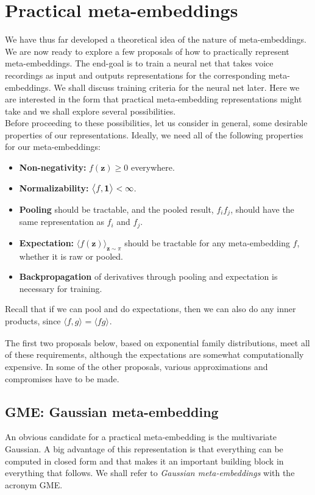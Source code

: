 \documentclass[a4paper,oneside,12pt,english]{report}
\def\zvec{\mathbf{z}}
\def\expv#1#2{\bigl\langle#1\bigr\rangle_{#2}}
\def\dot#1#2{\expv{#1,#2}{}}
\begin{document}
\chapter{Practical meta-embeddings}
We have thus far developed a theoretical idea of the nature of meta-embeddings. We are now ready to explore a few proposals of how to practically represent meta-embeddings. The end-goal is to train a neural net that takes voice recordings as input and outputs  representations for the corresponding meta-embeddings. We shall discuss training criteria for the neural net later. Here we are interested in the form that practical meta-embedding representations might take and we shall explore several possibilities. \\

\noindent Before proceeding to these possibilities, let us consider in general, some desirable properties of our representations. Ideally, we need all of the following properties for our meta-embeddings:
\begin{itemize}
	\item[] \textbf{Non-negativity:} $f(\zvec)\ge0$ everywhere.
	\item[] \textbf{Normalizability:} $\dot{f}{\onevec}<\infty$.
	\item[] \textbf{Pooling} should be tractable, and the pooled result, $f_if_j$, should have the same representation as $f_i$ and $f_j$.
	\item[] \textbf{Expectation:}  $\expv{f(\zvec)}{\zvec\sim\pi}$ should be tractable for any meta-embedding $f$, whether it is raw or pooled.
	\item[] \textbf{Backpropagation} of derivatives through pooling and expectation is necessary for training.
\end{itemize}
Recall that if we can pool and do expectations, then we can also do any inner products, since $\dot{f}{g}=\expv{fg}{}$.

The first two proposals below, based on exponential family distributions, meet all of these requirements, although the expectations are somewhat computationally expensive. In some of the other proposals, various approximations and compromises have to be made.



\section{GME: Gaussian meta-embedding}
\label{sec:MVG}
\def\dvec{\mathbf{d}}
An obvious candidate for a practical meta-embedding is the multivariate Gaussian. A big advantage of this representation is that everything can be computed in closed form and that makes it an important building block in everything that follows. We shall refer to \emph{Gaussian meta-embeddings} with the acronym GME.
\end{document}
